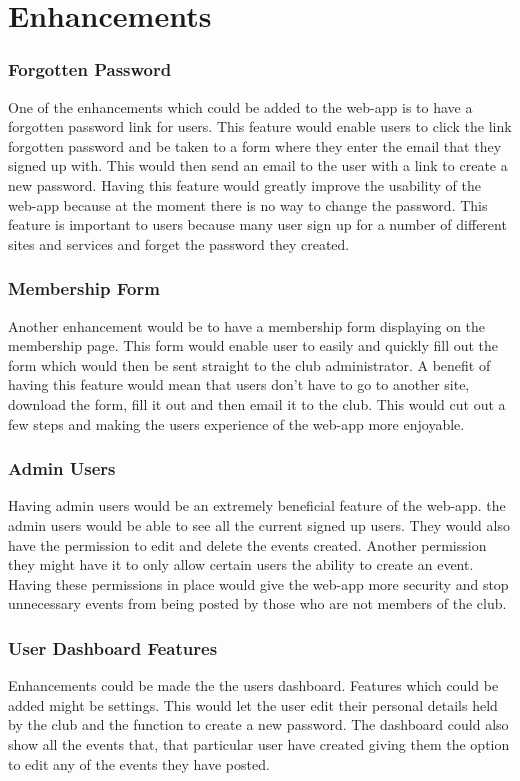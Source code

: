 \documentclass[10pt, a4paper]{article}
\begin{document}
    \newpage
    \section{Enhancements}
    \subsubsection{Forgotten Password}
    One of the enhancements which could be added to the web-app is to have a forgotten password link for users. This feature would enable users to click the link forgotten password and be taken to a form where they enter the email that they signed up with. This would then send an email to the user with a link to create a new password. Having this feature would greatly improve the usability of the web-app because at the moment there is no way to change the password. This feature is important to users because many user sign up for a number of different sites and services and forget the password they created. 
    
    \subsubsection{Membership Form}
    Another enhancement would be to have a membership form displaying on the membership page. This form would enable user to easily and quickly fill out the form which would then be sent straight to the club administrator. A benefit of having this feature would mean that users don't have to go to another site, download the form, fill it out and then email it to the club. This would cut out a few steps and making the users experience of the web-app more enjoyable.
    
    \subsubsection{Admin Users}
    Having admin users would be an extremely beneficial feature of the web-app. the admin users would be able to see all the current signed up users. They would also have the permission to edit and delete the events created. Another permission they might have it to only allow certain users the ability to create an event. Having these permissions in place would give the web-app more security and stop unnecessary events from being posted by those who are not members of the club.
     
    \subsubsection{User Dashboard Features}
    Enhancements could be made the the users dashboard. Features which could be added might be settings. This would let the user edit their personal details held by the club and the function to create a new password. The dashboard could also show all the events that, that particular user have created giving them the option to edit any of the events they have posted.
    
\end{document}
